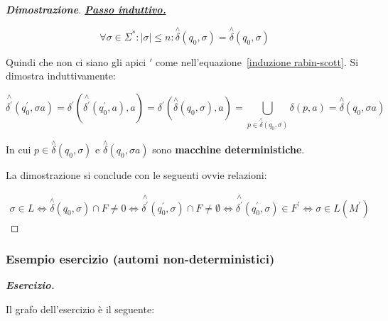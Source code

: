 \documentclass[a4paper]{article}
\begin{document}
\begin{proof}[\textbf{Dimostrazione}]
		\noindent
		\textbf{\emph{\underline{Passo induttivo.}}}
		
		\begin{equation*}
			\forall \sigma \in \Sigma^{*} : |\sigma| \le n : \overset{\wedge}{\delta} \left(q_{0}, \sigma\right) = \overset{\wedge}{\delta} \left(q_{0}, \sigma\right)
		\end{equation*}
	
		\noindent
		Quindi che non ci siano gli apici $'$ come nell'equazione~\ref{induzione rabin-scott}. Si dimostra induttivamente:
		
		\begin{equation*}
			\overset{\wedge}{\delta^{'}} \left(q_{0}^{'}, \sigma a\right) = \delta^{'} \left(\overset{\wedge}{\delta^{'}}\left(q_{0}^{'}, a\right), a\right) = \delta^{'} \left(\overset{\wedge}{\delta}\left(q_{0}, \sigma\right), a\right) = \bigcup_{p \in \overset{\wedge}{\delta}\left(q_{0}, \sigma\right)} \delta\left(p, a\right) = \overset{\wedge}{\delta} \left(q_{0}, \sigma a\right)
		\end{equation*}
	
		\noindent
		In cui $p \in \overset{\wedge}{\delta}\left(q_{0}, \sigma\right)$ e $\overset{\wedge}{\delta} \left(q_{0}, \sigma a\right)$ sono \textbf{macchine deterministiche}.
		
		\noindent
		La dimostrazione si conclude con le seguenti ovvie relazioni:
		
		\begin{gather*}
			\sigma \in L \iff
			\overset{\wedge}{\delta}\left(q_{0}, \sigma\right) \cap F \ne 0 \iff
			\overset{\wedge}{\delta^{'}}\left(q_{0}^{'}, \sigma\right) \cap F \ne \emptyset \iff
			\overset{\wedge}{\delta^{'}}\left(q_{0}^{'}, \sigma\right) \in F^{'} \iff
			\sigma \in L\left(M^{'}\right)
		\end{gather*}
	\end{proof}
	
	\newpage
	
	\subsubsection{Esempio esercizio (automi non-deterministici)}
	
	\textcolor{Red3}{\textbf{\emph{Esercizio.}}}
	
	\noindent
	Il grafo dell'esercizio è il seguente:
	
\end{document}
